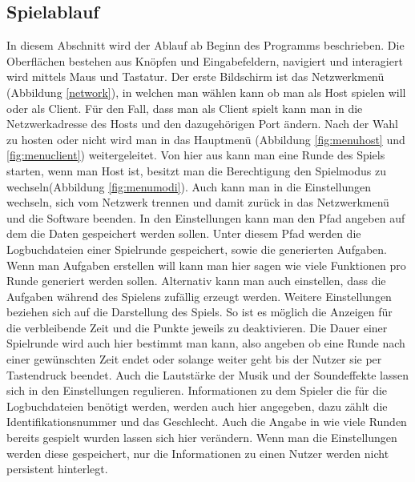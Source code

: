 \subsection{Spielablauf}
In diesem Abschnitt wird der Ablauf ab Beginn des Programms beschrieben. Die Oberflächen bestehen aus Knöpfen und Eingabefeldern, navigiert und interagiert wird mittels Maus und Tastatur. Der erste Bildschirm ist das Netzwerkmenü (Abbildung \ref{network}), in welchen man wählen kann ob man als Host spielen will oder als Client. Für den Fall, dass man als Client spielt kann man in die Netzwerkadresse des Hosts und den dazugehörigen Port ändern.\newline
Nach der Wahl zu hosten oder nicht wird man in das Hauptmenü (Abbildung \ref{fig:menuhost} und \ref{fig:menuclient}) weitergeleitet. Von hier aus kann man eine Runde des Spiels starten, wenn man Host ist, besitzt man die Berechtigung den Spielmodus zu wechseln(Abbildung \ref{fig:menumodi}). Auch kann man in die Einstellungen wechseln, sich vom Netzwerk trennen und damit zurück in das Netzwerkmenü und die Software beenden.\newline
In den Einstellungen kann man den Pfad angeben auf dem die Daten gespeichert werden sollen. Unter diesem Pfad werden die Logbuchdateien einer Spielrunde gespeichert, sowie die generierten Aufgaben. Wenn man Aufgaben erstellen will kann man hier sagen wie viele Funktionen pro Runde generiert werden sollen. Alternativ kann man auch einstellen, dass die Aufgaben während des Spielens zufällig erzeugt werden. Weitere Einstellungen beziehen sich auf die Darstellung des Spiels. So ist es möglich die Anzeigen für die verbleibende Zeit und die Punkte jeweils zu deaktivieren. Die Dauer einer Spielrunde wird auch hier bestimmt man kann, also angeben ob eine Runde nach einer gewünschten Zeit endet oder solange weiter geht bis der Nutzer sie per Tastendruck beendet. Auch die Lautstärke der Musik und der Soundeffekte lassen sich in den Einstellungen regulieren. Informationen zu dem Spieler die für die Logbuchdateien benötigt werden, werden auch hier angegeben, dazu zählt die Identifikationsnummer und das Geschlecht. Auch die Angabe in wie viele Runden bereits gespielt wurden lassen sich hier verändern. Wenn man die Einstellungen werden diese gespeichert, nur die Informationen zu einen Nutzer werden nicht persistent hinterlegt.

